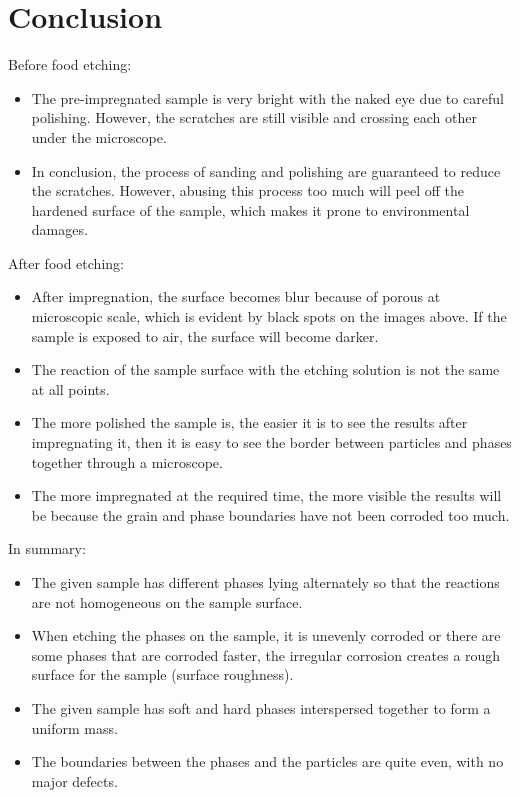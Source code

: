 \section{Conclusion}
Before food etching:
\begin{itemize}
	\item The pre-impregnated sample is very bright with the naked eye due to careful polishing. However, the scratches are still visible and crossing each other under the microscope.
	\item In conclusion, the process of sanding and polishing are guaranteed to reduce the scratches. However, abusing this process too much will peel off the hardened surface of the sample, which makes it prone to environmental damages. 
\end{itemize}
 
After food etching:
\begin{itemize}
	\item After impregnation, the surface becomes blur because of porous at microscopic scale, which is evident by black spots on the images above. If the sample is exposed to air, the surface will become darker.
	\item The reaction of the sample surface with the etching solution is not the same at all points.
	\item The more polished the sample is, the easier it is to see the results after impregnating it, then it is easy to see the border between particles and phases together through a microscope.
	\item The more impregnated at the required time, the more visible the results will be because the grain and phase boundaries have not been corroded too much. 
\end{itemize}

In summary:
\begin{itemize}
	\item The given sample has different phases lying alternately so that the reactions are not homogeneous on the sample surface.
	\item When etching the phases on the sample, it is unevenly corroded or there are some phases that are corroded faster, the irregular corrosion creates a rough surface for the sample (surface roughness).
	\item The given sample has soft and hard phases interspersed together to form a uniform mass.
	\item The boundaries between the phases and the particles are quite even, with no major defects. 
\end{itemize}
